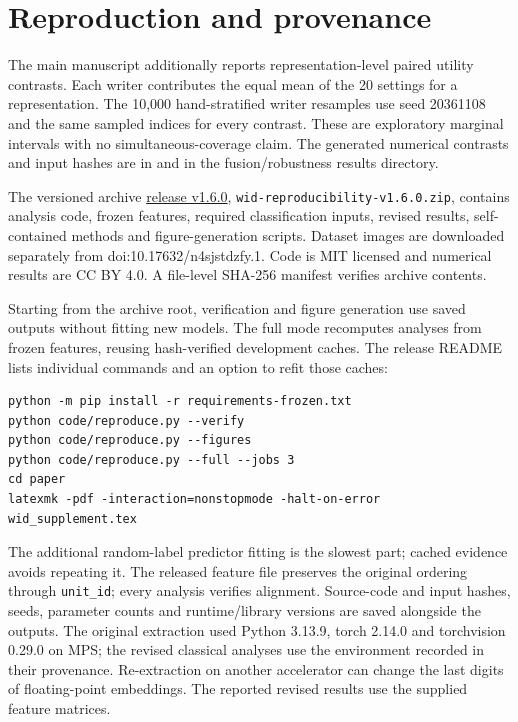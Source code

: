 \documentclass[10pt,a4paper]{article}
\begin{document}
\section{Reproduction and provenance}
The main manuscript additionally reports representation-level paired utility contrasts. Each writer contributes the equal mean of the 20 settings for a representation. The 10,000 hand-stratified writer resamples use seed 20361108 and the same sampled indices for every contrast. These are exploratory marginal intervals with no simultaneous-coverage claim. The generated numerical contrasts and input hashes are in  and  in the fusion/robustness results directory.

The versioned archive \href{https://github.com/LegendaryBeast/Bangla-writer-identification-research/releases/tag/v1.6.0}{release v1.6.0}, \texttt{wid-reproducibility-v1.6.0.zip}, contains analysis code, frozen features, required classification inputs, revised results, self-contained methods and figure-generation scripts. Dataset images are downloaded separately from doi:10.17632/n4sjstdzfy.1. Code is MIT licensed and numerical results are CC BY 4.0. A file-level SHA-256 manifest verifies archive contents.

Starting from the archive root, verification and figure generation use saved outputs without fitting new models. The full mode recomputes analyses from frozen features, reusing hash-verified development caches. The release README lists individual commands and an option to refit those caches:
\begin{samepage}
\begin{verbatim}
python -m pip install -r requirements-frozen.txt
python code/reproduce.py --verify
python code/reproduce.py --figures
python code/reproduce.py --full --jobs 3
cd paper
latexmk -pdf -interaction=nonstopmode -halt-on-error wid_supplement.tex
\end{verbatim}
\end{samepage}
The additional random-label predictor fitting is the slowest part; cached evidence avoids repeating it. The released feature file preserves the original ordering through \texttt{unit\_id}; every analysis verifies alignment. Source-code and input hashes, seeds, parameter counts and runtime/library versions are saved alongside the outputs. The original extraction used Python 3.13.9, torch 2.14.0 and torchvision 0.29.0 on MPS; the revised classical analyses use the environment recorded in their provenance. Re-extraction on another accelerator can change the last digits of floating-point embeddings. The reported revised results use the supplied feature matrices.
\end{document}

